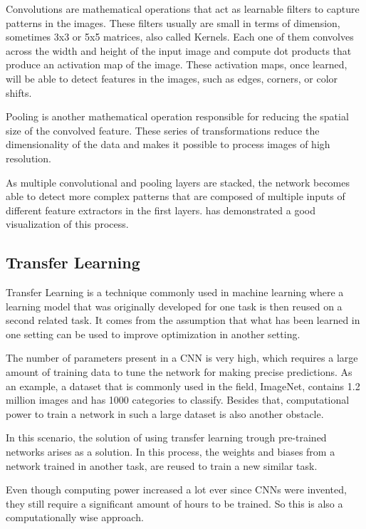 Convolutions are mathematical operations that act as learnable filters to capture patterns in the images. These filters usually are small in terms of dimension, sometimes 3x3 or 5x5 matrices, also called Kernels. Each one of them convolves across the width and height of the input image and compute dot products that produce an activation map of the image. These activation maps, once learned, will be able to detect features in the images, such as edges, corners, or color shifts. 

Pooling is another mathematical operation responsible for reducing the spatial size of the convolved feature. These series of transformations reduce the dimensionality of the data and makes it possible to process images of high resolution. 

As multiple convolutional and pooling layers are stacked, the network becomes able to detect more complex patterns that are composed of multiple inputs of different feature extractors in the first layers. \citep{} has demonstrated a good visualization of this process. 

\subsection{Transfer Learning}

Transfer Learning is a technique commonly used in machine learning where a learning model that was originally developed for one task is then reused on a second related task. It comes from the assumption that what has been learned in one setting can be used to improve optimization in another setting.

The number of parameters present in a CNN is very high, which requires a large amount of training data to tune the network for making precise predictions. As an example, a dataset that is commonly used in the field, ImageNet, contains 1.2 million images and has 1000 categories to classify. Besides that, computational power to train a network in such a large dataset is also another obstacle.

In this scenario, the solution of using transfer learning trough pre-trained networks arises as a solution. In this process, the weights and biases from a network trained in another task, are reused to train a new similar task.

Even though computing power increased a lot ever since CNNs were invented, they still require a significant amount of hours to be trained. So this is also a computationally wise approach.

